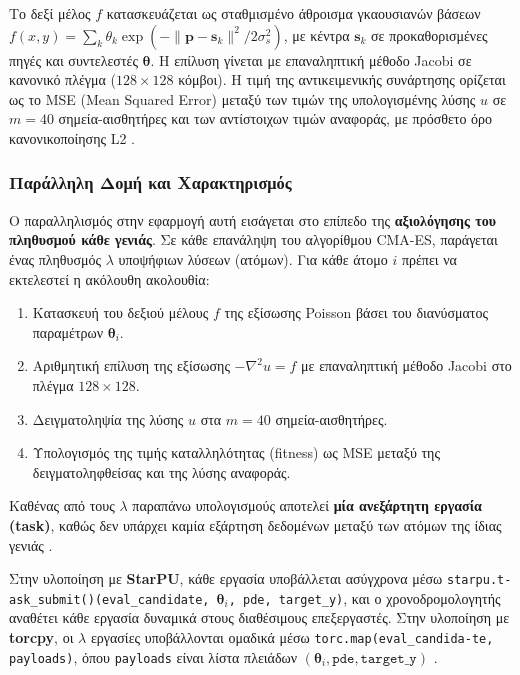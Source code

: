 Το δεξί μέλος $f$ κατασκευάζεται ως σταθμισμένο άθροισμα γκαουσιανών βάσεων $f(x,y) = \sum_k \theta_k \exp\!\left(-\|\mathbf{p} - \mathbf{s}_k\|^2 / 2\sigma_s^2\right)$, με κέντρα $\mathbf{s}_k$ σε προκαθορισμένες πηγές και συντελεστές $\boldsymbol{\theta}$. Η επίλυση γίνεται με επαναληπτική μέθοδο Jacobi σε κανονικό πλέγμα ($128\times128$ κόμβοι). Η τιμή της αντικειμενικής συνάρτησης ορίζεται ως το MSE (Mean Squared Error) μεταξύ των τιμών της υπολογισμένης λύσης $u$ σε $m=40$ σημεία-αισθητήρες και των αντίστοιχων τιμών αναφοράς, με πρόσθετο όρο κανονικοποίησης L2 \cite{appcode}.

\subsubsection{Παράλληλη Δομή και Χαρακτηρισμός}

Ο παραλληλισμός στην εφαρμογή αυτή εισάγεται στο επίπεδο της \textbf{αξιολόγησης του πληθυσμού κάθε γενιάς}. Σε κάθε επανάληψη του αλγορίθμου CMA-ES, παράγεται ένας πληθυσμός $\lambda$ υποψήφιων λύσεων (ατόμων). Για κάθε άτομο $i$ πρέπει να εκτελεστεί η ακόλουθη ακολουθία:

\begin{enumerate}
  \item Κατασκευή του δεξιού μέλους $f$ της εξίσωσης Poisson βάσει του διανύσματος παραμέτρων $\boldsymbol{\theta}_i$.
  \item Αριθμητική επίλυση της εξίσωσης $-\nabla^2 u = f$ με επαναληπτική μέθοδο Jacobi στο πλέγμα $128\times128$.
  \item Δειγματοληψία της λύσης $u$ στα $m=40$ σημεία-αισθητήρες.
  \item Υπολογισμός της τιμής καταλληλότητας (fitness) ως MSE μεταξύ της δειγματοληφθείσας και της λύσης αναφοράς.
\end{enumerate}

Καθένας από τους $\lambda$ παραπάνω υπολογισμούς αποτελεί \textbf{μία ανεξάρτητη εργασία (task)}, καθώς δεν υπάρχει καμία εξάρτηση δεδομένων μεταξύ των ατόμων της ίδιας γενιάς \cite{appcode}.

Στην υλοποίηση με \textbf{StarPU}, κάθε εργασία υποβάλλεται ασύγχρονα μέσω \texttt{starpu.t-\linebreak ask\_submit()(eval\_candidate, $\boldsymbol{\theta}_i$, pde, target\_y)}, και ο χρονοδρομολογητής αναθέτει κάθε εργασία δυναμικά στους διαθέσιμους επεξεργαστές. Στην υλοποίηση με \textbf{torcpy}, οι $\lambda$ εργασίες υποβάλλονται ομαδικά μέσω \texttt{torc.map(eval\_candida-\linebreak te, payloads)}, όπου \texttt{payloads} είναι λίστα πλειάδων $(\boldsymbol{\theta}_i, \texttt{pde}, \texttt{target\_y})$ \cite{appcode}.

